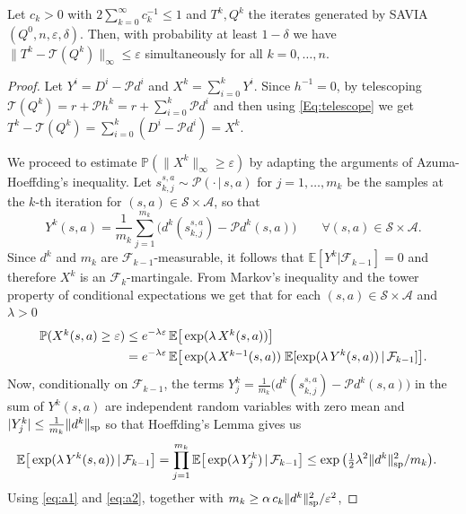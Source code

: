 \documentclass{article}
\newcommand{\cA}{\mathcal{A}}
\newcommand{\cS}{\mathcal{S}}
\newcommand{\cP}{\mathcal{P} }
\newcommand{\expec}{\mathbb{E}}
\newcommand{\prob}{\mathbb{P}}
\newcommand{\T}{\mathcal{T}}
\renewcommand{\sp}[1]{\|{#1}\|_\text{\rm sp}}
\newcommand{\R}{r}
\newenvironment{manualproposition}[1]{%
  \renewcommand\themanualpropinner{#1}%
  \manualpropinner
}{\endmanualpropinner}
\theoremstyle{plain}
\theoremstyle{definition}
\theoremstyle{remark}
\begin{document}
\begin{manualproposition}{\ref{prop:sam-err0}}
Let $c_k>0$  with \mbox{$2\sum_{k=0}^\infty c_k^{-1}\leq 1$} and $T^k, Q^k$ the iterates generated by \mbox{\rm SAVIA}$(Q^0,n,\varepsilon,\delta)$.
Then, with probability at least $1-\delta$ we have $\|T^k-\T(Q^k)\|_\infty\le  \varepsilon$ simultaneously for 
 all $k=0,\ldots,n$.
\end{manualproposition}
\vspace{-3ex} 
\begin{proof}
Let $Y^i=D^i-\cP d^i$ and $X^k=\sum_{i=0}^kY^i$.
Since $h^{-1}=0$, by telescoping $\T(Q^k)=\R+\cP h^k=\R+\sum_{i=0}^k\cP d^i$ and then using \eqref{Eq:telescope} we get $T^k-\T(Q^k)=\sum_{i=0}^k(D^i-\cP d^i)=X^k$. 
     
We proceed to estimate $\prob(\|X^k\|_\infty\geq\varepsilon)$
by adapting the arguments of Azuma-Hoeffding's inequality.
Let $s_{k,j}^{s,a}\sim \cP(\cdot \,|\, s,a)$ for $j=1,\ldots,m_k$ be the samples at the $k$-th iteration for $(s,a)\in\cS\times \cA$, so that 
     $$ Y^{k}(s,a) =\mbox{$\frac{1}{m_k}\sum_{j=1}^{m_k}\big(d^k(s^{s,a}_{k,j})$}-\cP d^k(s,a)\big)\qquad\forall (s,a)\in\cS\times\cA.$$ 
     Since $d^k$ and $m_k$ are $\mathcal{F}_{k-1}$-measurable, it follows that $\expec{[Y^{k}|\mathcal{F}_{k-1}]}=0$ 
     and therefore $X^k$ is an $\mathcal{F}_{k}$-martingale.
From Markov's inequality and the tower property of conditional expectations we get that for each $(s,a)\in\cS\times \cA$ and $\lambda>0$
\begin{align}\nonumber
   \mbox{$ \prob( X^k(s,a) \ge \varepsilon)$} 
   & \le e^{-\lambda\varepsilon}\,\expec\big[\exp(\lambda\, \mbox{$X^k(s,a)$})\big]\\
   &= e^{-\lambda\varepsilon}\,\expec\big[\exp(\lambda\,\mbox{$X^{k-1}(s,a)$}) \;\expec[\exp(\lambda \, Y^{k}(s,a)) \,|\, \mathcal{F}_{k-1}]\big].\label{eq:a1}
\end{align}
Now, conditionally on $\mathcal{F}_{k-1}$, the terms $Y^k_j=\mbox{$\frac{1}{m_k}\big(d^k(s^{s,a}_{k,j})$}-\cP d^k(s,a)\big)$ in the sum of $Y^k(s,a)$ are independent random variables with zero mean  and $|Y^k_j| \le \frac{1}{m_k}\sp{d^k}$ so that Hoeffding's Lemma gives us
\begin{align}
    \expec\big[\exp(\lambda\,Y^{k}(s,a)) \,|\, \mathcal{F}_{k-1}\big]  &=\prod_{j=1}^{m_k}\expec\big[\exp(\lambda\,Y^k_j) \,|\, \mathcal{F}_{k-1}\big] 
    \le \exp\big(\mbox{$\frac{1}{2}$}\lambda^2\sp{d^k}^2/m_k\big). \label{eq:a2}
\end{align}
Using \eqref{eq:a1} and \eqref{eq:a2}, together with $m_k\geq \alpha\,c_k\sp{d^k}^2/\varepsilon^{2}$, 

\end{proof}
\end{document}
